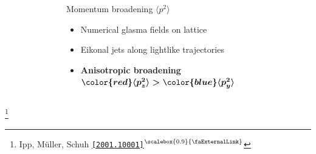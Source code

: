 \documentclass[aspectratio=169,11pt,usenames,dvipsnames]{beamer}
\renewcommand{\thefootnote}{\color{customblue}\faPaperPlaneO}
\newcommand\blfootnote[1]{%
  \begingroup
  \renewcommand\thefootnote{}\footnote{#1}%
  \addtocounter{footnote}{-1}%
  \endgroup
}
\begin{document}
\begin{frame}[t,noframenumbering]
\begin{columns}[onlytextwidth,t]
\begin{figure}
        \end{figure}
        \begin{center}
            {\Large\color{isgold} Momentum broadening $\langle p^2\rangle$ \\[10pt]}
            \footnotesize
                \begin{itemize}
                    \item {\color{lightgray}Numerical glasma fields on lattice}
                    \item {\color{lightgray} Eikonal jets along lightlike trajectories}
                    \item {\color{lightgray}\bfseries Anisotropic broadening $\boldsymbol{{\color{red}\langle p^2_z\rangle}>{\color{blue}\langle p^2_y\rangle}}$}
                \end{itemize}
        \end{center}
    \end{columns}
    \blfootnote{\scriptsize Ipp, Müller, Schuh \href{https://arxiv.org/abs/2001.10001}{\color{palgold}\texttt{[2001.10001]}$^\text{\scalebox{0.9}{\faExternalLink}}$}}
\end{frame}

\end{document}
